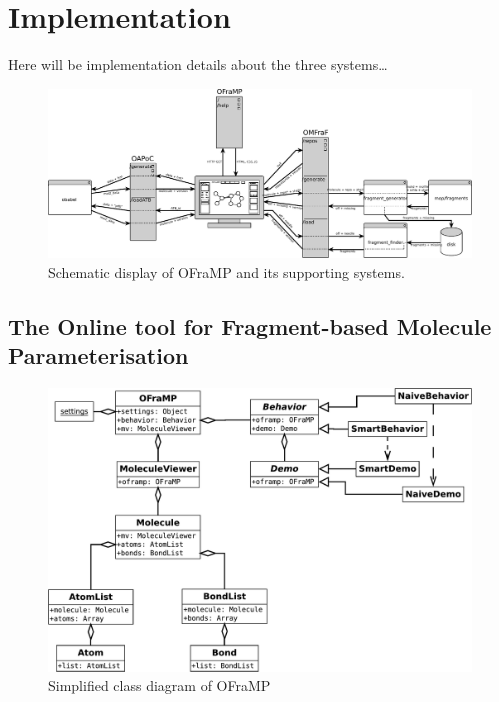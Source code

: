 \chapter{Implementation}

Here will be implementation details about the three systems\ldots

\nlipsum


\begin{figure}
\begin{center}
\includegraphics[width=\textwidth]{img/diagram.pdf}
\vspace{1em}
\caption{Schematic display of OFraMP and its supporting systems.}
\end{center}
\end{figure}


\section[OFraMP]{The Online tool for Fragment-based Molecule Parameterisation}
\nlipsum

\begin{figure}[h!]
\begin{center}
\includegraphics[width=\textwidth]{img/oframp_class.pdf}
\caption{Simplified class diagram of OFraMP}
\end{center}
\end{figure}

